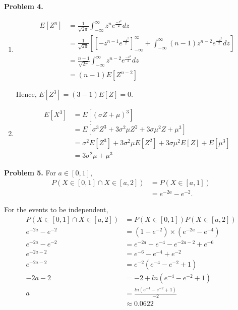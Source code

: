 \documentclass{article}
\begin{document}
\textbf{Problem 4.}
\begin{enumerate}[label={(\alph*)}]
    \item 
    \begin{align}
        E[Z^n] & = \frac{1}{\sqrt{2\pi}}\int_{-\infty}^{\infty}z^ne^{\frac{-z^2}{2}}dz \\
        & = \frac{1}{\sqrt{2\pi}}\left[\left[-z^{n-1}e^{\frac{-z^2}{2}}\right]_{-\infty}^{\infty}+\int_{-\infty}^{\infty}(n-1)z^{n-2}e^{\frac{-z^2}{2}}dz\right] \\
        & = \frac{n-1}{\sqrt{2\pi}}\int_{-\infty}^{\infty}z^{n-2}e^{\frac{-z^2}{2}}dz \\
        & = (n-1)E[Z^{n-2}]
    \end{align}
    
    Hence, $E[Z^3]=(3-1)E[Z]=0.$

    \item 
    \begin{align}
        E[X^3] & = E[\left(\sigma Z+\mu\right)^3] \\
        & = E[\sigma^3Z^3+3\sigma^2\mu Z^2+3\sigma\mu^2Z+\mu^3] \\
        & = \sigma^2E[Z^3]+3\sigma^2\mu E[Z^2]+3\sigma\mu^2E[Z]+E[\mu^3] \\
        & =3\sigma^2\mu+\mu^3
    \end{align}
\end{enumerate}
\bigbreak

\textbf{Problem 5.}
For $a \in [0,1]$,
\begin{align}
    P(X \in [0,1] \cap X \in [a,2]) & = P(X\in[a,1]) \\
    & = e^{-2a}-e^{-2}.
\end{align}

For the events to be independent,
\begin{align}
    P(X \in [0,1] \cap X \in [a,2]) & =P(X\in [0,1])P(X\in [a,2]) \\
    e^{-2a}-e^{-2} & = \left(1-e^{-2}\right)\times \left(e^{-2a}-e^{-4}\right) \\
    e^{-2a}-e^{-2} & = e^{-2a}-e^{-4}-e^{-2a-2}+e^{-6} \\
    e^{-2a-2} & =e^{-6}-e^{-4}+e^{-2} \\
    e^{-2a-2} & =e^{-2}\left(e^{-4}-e^{-2}+1\right) \\
    -2a-2 & = -2 + ln(e^{-4}-e^{-2}+1) \\
    a & = \frac{ln(e^{-4}-e^{-2}+1)}{-2} \\
    & \approx 0.0622
\end{align}
\bigbreak
\end{document}
